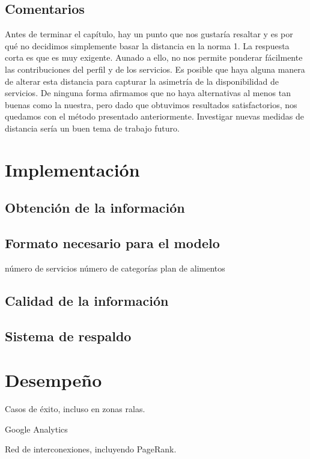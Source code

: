\documentclass[12pt]{report}
\begin{document}
\section{Comentarios}

Antes de terminar el capítulo, hay un punto que nos gustaría resaltar y es por qué no decidimos simplemente basar la distancia en la norma 1. La respuesta corta es que es muy exigente. Aunado a ello, no nos permite ponderar fácilmente las contribuciones del perfil y de los servicios. Es posible que haya alguna manera de alterar esta distancia para capturar la asimetría de la disponibilidad de servicios. De ninguna forma afirmamos que no haya alternativas al menos tan buenas como la nuestra, pero dado que obtuvimos resultados satisfactorios, nos quedamos con el método presentado anteriormente. Investigar nuevas medidas de distancia sería un buen tema de trabajo futuro.




\chapter{Implementación}
\section{Obtención de la información}
\section{Formato necesario para el modelo}
número de servicios
número de categorías
plan de alimentos
\section{Calidad de la información}
\section{Sistema de respaldo}
\chapter{Desempeño}
Casos de éxito, incluso en zonas ralas.

Google Analytics

Red de interconexiones, incluyendo PageRank.
\end{document}
